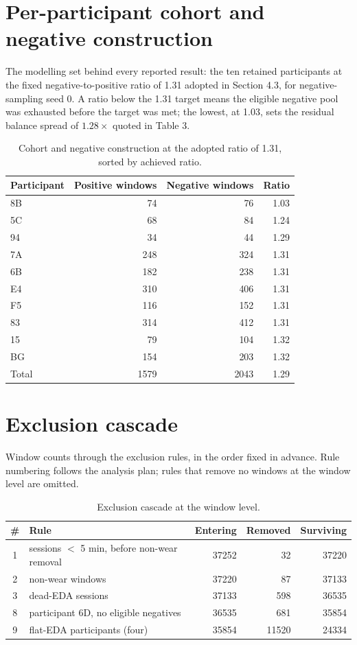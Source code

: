 \section{Per-participant cohort and negative construction}
\label{app:cohort}

The modelling set behind every reported result: the ten retained
participants at the fixed negative-to-positive ratio of 1.31 adopted in
Section 4.3, for negative-sampling seed 0. A ratio below the 1.31 target
means the eligible negative pool was exhausted before the target was met;
the lowest, at 1.03, sets the residual balance spread of
$1.28\times$ quoted in Table 3.

\begin{table}[h]
\centering
\begin{tabular}{lrrr}
\toprule
Participant & Positive windows & Negative windows & Ratio \\
\midrule
8B & 74 & 76 & 1.03 \\
5C & 68 & 84 & 1.24 \\
94 & 34 & 44 & 1.29 \\
7A & 248 & 324 & 1.31 \\
6B & 182 & 238 & 1.31 \\
E4 & 310 & 406 & 1.31 \\
F5 & 116 & 152 & 1.31 \\
83 & 314 & 412 & 1.31 \\
15 & 79 & 104 & 1.32 \\
BG & 154 & 203 & 1.32 \\
\midrule
Total & 1579 & 2043 & 1.29 \\
\bottomrule
\end{tabular}
\caption{Cohort and negative construction at the adopted ratio of 1.31, sorted by achieved ratio.}
\end{table}

\section{Exclusion cascade}
\label{app:attrition}

Window counts through the exclusion rules, in the order fixed in advance.
Rule numbering follows the analysis plan; rules that remove no windows at
the window level are omitted.

\begin{table}[h]
\centering
\begin{tabular}{cp{5.8cm}rrr}
\toprule
\# & Rule & Entering & Removed & Surviving \\
\midrule
1 & sessions $<$ 5 min, before non-wear removal & 37252 & 32 & 37220 \\
2 & non-wear windows & 37220 & 87 & 37133 \\
3 & dead-EDA sessions & 37133 & 598 & 36535 \\
8 & participant 6D, no eligible negatives & 36535 & 681 & 35854 \\
9 & flat-EDA participants (four) & 35854 & 11520 & 24334 \\
\bottomrule
\end{tabular}
\caption{Exclusion cascade at the window level.}
\end{table}

